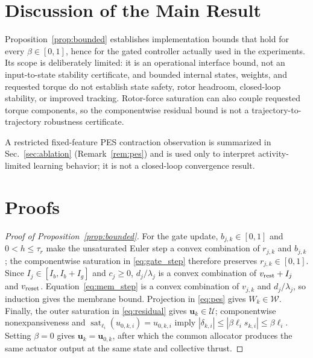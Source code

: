 \documentclass[letterpaper, 10 pt, conference]{ieeeconf}
\newcommand{\sat}{\operatorname{sat}}
\begin{document}
\section{Discussion of the Main Result}
\label{sec:discussion}
Proposition~\ref{prop:bounded} establishes implementation bounds that hold for every $\beta\in[0,1]$, hence for the gated controller actually used in the experiments. Its scope is deliberately limited: it is an operational interface bound, not an input-to-state stability certificate, and bounded internal states, weights, and requested torque do not establish state safety, rotor headroom, closed-loop stability, or improved tracking. Rotor-force saturation can also couple requested torque components, so the componentwise residual bound is not a trajectory-to-trajectory robustness certificate.

A restricted fixed-feature PES contraction observation is summarized in Sec.~\ref{sec:ablation} (Remark~\ref{rem:pes}) and is used only to interpret activity-limited learning behavior; it is not a closed-loop convergence result.

\section{Proofs}
\label{sec:proofs}
\begin{proof}[Proof of Proposition~\ref{prop:bounded}]
For the gate update, $b_{j,k}\in[0,1]$ and $0<h\le\tau_r$ make the unsaturated Euler step a convex combination of $r_{j,k}$ and $b_{j,k}$; the componentwise saturation in \eqref{eq:gate_step} therefore preserves $r_{j,k}\in[0,1]$. Since $I_j\in[I_b,I_b+I_g]$ and $c_j\ge0$, $d_j/\lambda_j$ is a convex combination of $v_{\rm rest}+I_j$ and $v_{\rm reset}$. Equation~\eqref{eq:mem_step} is a convex combination of $v_{j,k}$ and $d_j/\lambda_j$, so induction gives the membrane bound. Projection in \eqref{eq:pes} gives $W_k\in\mathcal W$. Finally, the outer saturation in \eqref{eq:residual} gives $\bm u_k\in\mathcal U$; componentwise nonexpansiveness and $\sat_{\ell_i}(u_{0,k,i})=u_{0,k,i}$ imply $|\delta_{k,i}|\le|\beta\ell_i s_{k,i}|\le\beta\ell_i$. Setting $\beta=0$ gives $\bm u_k=\bm u_{0,k}$, after which the common allocator produces the same actuator output at the same state and collective thrust.
\end{proof}
\end{document}
